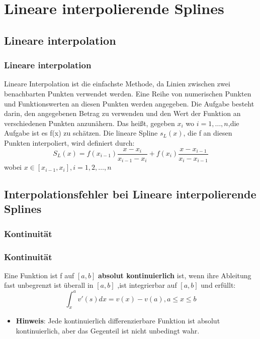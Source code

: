 {\begin{frame}
		\end{frame}
		
		\section{Lineare interpolierende Splines}
		\subsection{Lineare interpolation}
		
		\begin{frame}
			\frametitle{Lineare interpolation}		
			Lineare Interpolation ist die einfachste Methode, da Linien zwischen zwei benachbarten Punkten verwendet werden. Eine Reihe von numerischen Punkten und Funktionswerten an diesen Punkten werden angegeben. Die Aufgabe besteht darin, den angegebenen Betrag zu verwenden und den Wert der Funktion an verschiedenen Punkten anzunähern. Das heißt, gegeben \(x_i\) wo \(i=1,\dots,n\),die Aufgabe ist es f(x) zu schätzen.
			Die lineare Spline \(s_L{}(x)\), die f an diesen Punkten interpoliert, wird definiert durch:\cite{lecture17}
			\[S_L{}(x)=f(x_{i-1}) \frac{x - x_i}{x_{i-1}-x_i} + f(x_i) \frac{x - x_{i-1}}{x_i - x_{i-1}}\] wobei \(x \in [x_{i-1},x_i],i = 1,2,\dots,n\)
		\end{frame}
		
		
		\subsection{Interpolationsfehler bei Lineare interpolierende Splines}
		
		\subsubsection{Kontinuität}
		\begin{frame}
			\frametitle{Kontinuität}
			Eine Funktion ist f auf \([a, b]\) \textbf{absolut kontinuierlich} ist, wenn ihre Ableitung fast unbegrenzt ist überall in  \([a, b]\) ,ist integrierbar auf \([a, b]\) und erfüllt:
			\[\int_x^a v'(s) dx = v(x)-v(a) ,a \leq x\leq b\]
			
			\begin{itemize}                
				\item \textbf{Hinweis}:
				Jede kontinuierlich differenzierbare Funktion ist absolut kontinuierlich, aber das Gegenteil ist nicht unbedingt wahr.
			\end{itemize}
		\end{frame}
		
}
